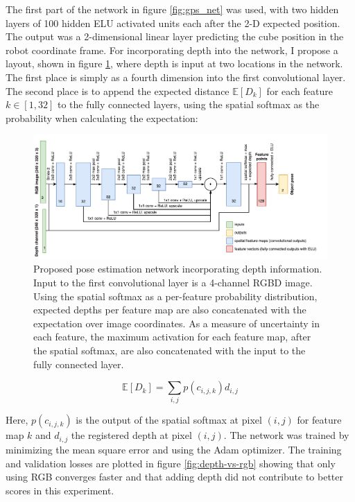 The first part of the network in figure \ref{fig:gps_net} was used, with two
hidden layers of 100 hidden ELU activated units each after the 2-D expected
position. The output was a 2-dimensional linear layer predicting the cube
position in the robot coordinate frame. For incorporating depth into the
network, I propose a layout, shown in figure \ref{fig:depth_net}, where depth
is input at two locations in the network. The first place is simply as a fourth
dimension into the first convolutional layer. The second place is to append the
expected distance $\mathbb{E}[D_k]$ for each feature $k \in [1, 32]$ to the
fully connected layers, using the spatial softmax as the probability when
calculating the expectation:

\begin{figure}[h!]
    \centering
    \includegraphics[width=1.0 \textwidth]{res/depth_net.pdf}

    \caption{Proposed pose estimation network incorporating depth information.
    Input to the first convolutional layer is a 4-channel RGBD image.  Using
    the spatial softmax as a per-feature probability distribution, expected
    depths per feature map are also concatenated with the expectation over
    image coordinates. As a measure of uncertainty in each feature, the maximum
    activation for each feature map, after the spatial softmax, are also
    concatenated with the input to the fully connected layer.}

    \label{fig:depth_net}
    
\end{figure}

\begin{equation}
    \mathbb{E}[D_{k}] = \sum_{i, j} p(c_{i, j, k}) d_{i, j}
\end{equation}

Here, $p(c_{i, j, k})$ is the output of the spatial softmax at pixel $(i, j)$
for feature map $k$ and $d_{i, j}$ the registered depth at pixel $(i, j)$. The
network was trained by minimizing the mean square error and using the Adam
optimizer. The training and validation losses are plotted in figure
\ref{fig:depth-vs-rgb} showing that only using RGB converges faster and that
adding depth did not contribute to better scores in this experiment.

